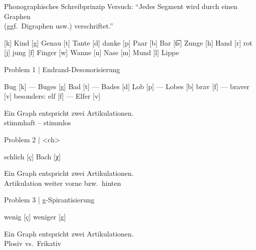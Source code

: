 \begin{frame}
  {Phonographisches Schreibprinzip}
  \onslide<+->
  \onslide<+->
  Versuch: "`Jedes Segment wird durch einen Graphen\\
  (ggf.\ Digraphen usw.) verschriftet."'\\
  \onslide<+->
  \Zeile
  \begin{exe}
    \ex{} [k] \alert{K}ind [g] \alert{G}enau
    \ex{} [t] \alert{T}ante [d] \alert{d}anke
    \ex{} [p] \alert{P}aar [b] \alert{B}ar 
    \ex{} [t͡s] \alert{Z}unge
    \ex{} [h] \alert{H}and [r] \alert{r}ot [j] \alert{j}ung [f] \alert{F}inger [w] \alert{W}anne
    \ex{} [n] \alert{N}ase [m] \alert{M}und [l] \alert{L}ippe
  \end{exe}
\end{frame}


\begin{frame}
  {Problem 1 | Endrand-Desonorisierung}
  \onslide<+->
  \onslide<+->
  \begin{exe}
    \ex Bu\alert{g} [k] --- Bu\alert{g}es [g]
    \ex Ba\alert{d} [t] --- Ba\alert{d}es [d]
    \ex Lo\alert{b} [p] --- Lo\alert{b}es [b]
    \ex bra\alert{v} [f] --- bra\alert{v}er [v]
    \Halbzeile
    \ex besonders: el\alert{f} [f] --- El\alert{f}er [v]
  \end{exe}
  \onslide<+->
  \Zeile
  \alert{Ein Graph} entspricht \alert{zwei Artikulationen}.\\
  \alert{stimmhaft -- stimmlos} 
\end{frame}


\begin{frame}
  {Problem 2 | <ch>}
  \onslide<+->
  \onslide<+->
  \begin{exe}
    \ex schli\alert{ch} [ç]
    \ex Ba\alert{ch} [χ]
  \end{exe}
  \onslide<+->
  \Zeile
  \alert{Ein Graph} entspricht \alert{zwei Artikulationen}.\\
  \alert{Artikulation weiter vorne bzw.\ hinten} 
\end{frame}

\begin{frame}
  {Problem 3 | g-Spirantisierung}
  \onslide<+->
  \onslide<+->
  \begin{exe}
    \ex weni\alert{g} [ç]
    \ex weni\alert{g}er [g]
  \end{exe}
  \onslide<+->
  \Zeile
  \alert{Ein Graph} entspricht \alert{zwei Artikulationen}.\\
  \alert{Plosiv vs.\ Frikativ} 
\end{frame}

